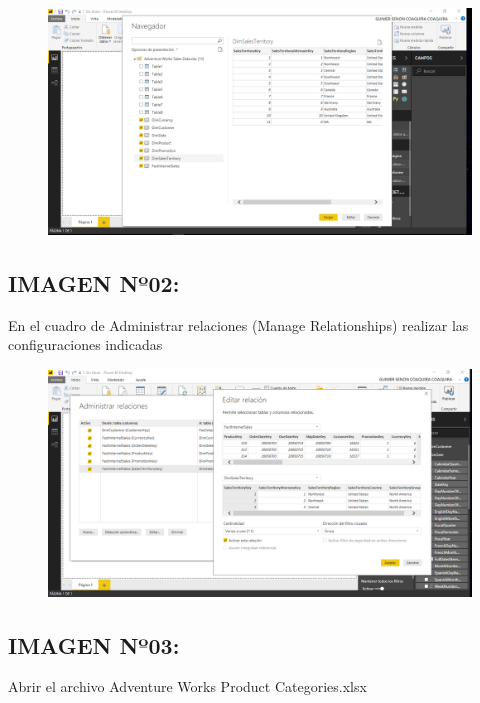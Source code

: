 \begin{figure}[httb]
\begin{center}
\includegraphics[width=13cm]{./Imagenes/Captura01}
\end{center}
\end{figure}

\subsection{IMAGEN Nº02:}
\begin{itemize}
En el cuadro de Administrar relaciones (Manage Relationships) realizar las configuraciones indicadas 
\end{itemize} 

\begin{figure}[httb]
\begin{center}
\includegraphics[width=13cm]{./Imagenes/Captura02}
\end{center}
\end{figure}
\newpage
\subsection{IMAGEN Nº03:}
\begin{itemize}
Abrir el archivo Adventure Works Product Categories.xlsx
\end{itemize} 

